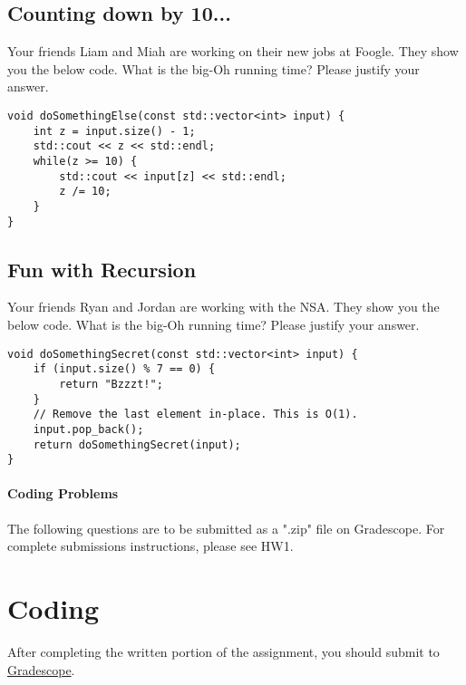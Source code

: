 \documentclass [12pt]{article}
\begin{document}
\subsection{Counting down by 10...}
 Your friends Liam and Miah are working on their new jobs at Foogle. They show you the below code. What is the big-Oh running time? Please justify your answer.

\vspace{2em}
\begin{verbatim}
void doSomethingElse(const std::vector<int> input) {
    int z = input.size() - 1;
    std::cout << z << std::endl;
    while(z >= 10) {
        std::cout << input[z] << std::endl;
        z /= 10;
    }
}
\end{verbatim}


\pagebreak
\subsection{Fun with Recursion}
 Your friends Ryan and Jordan are working with the NSA. They show you the below code. What is the big-Oh running time? Please justify your answer.

\vspace{2em}
\begin{verbatim}
void doSomethingSecret(const std::vector<int> input) {
    if (input.size() % 7 == 0) {
        return "Bzzzt!";
    }
    // Remove the last element in-place. This is O(1).
    input.pop_back();
    return doSomethingSecret(input);
}
\end{verbatim}


\pagebreak
\begin{Instruction}

\paragraph{Coding Problems} The following questions are to be submitted as a ".zip" file on Gradescope. For complete submissions instructions, please see HW1.

\end{Instruction}

\section{Coding}
 After completing the written portion of the assignment, you should submit to \href{https://www.gradescope.com/courses/350304}{Gradescope}.
\end{document}
